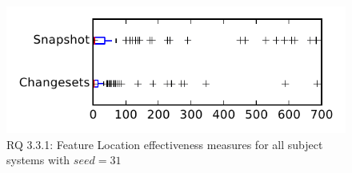 
\begin{figure}
\centering
\includegraphics[height=0.4\textheight]{figures/flt_seed/rq1_tiny_31}
\caption{RQ 3.3.1: Feature Location effectiveness measures for all subject systems with $seed=31$}
\label{fig:flt_seed:rq1:tiny}
\end{figure}
